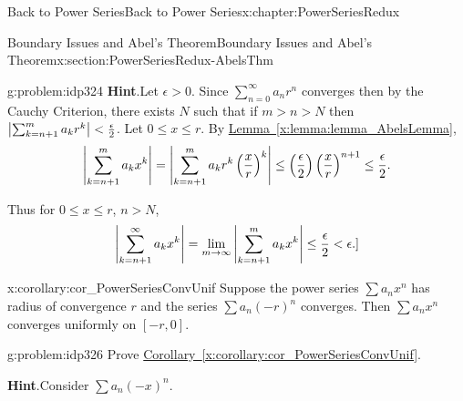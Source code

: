 \begin{chapterptx}{Back to Power Series}{}{Back to Power Series}{}{}{x:chapter:PowerSeriesRedux}
\begin{sectionptx}{Boundary Issues and Abel's Theorem}{}{Boundary Issues and Abel's Theorem}{}{}{x:section:PowerSeriesRedux-AbelsThm}
\begin{problem}{}{g:problem:idp324}
			\noindent\textbf{\blocktitlefont Hint}.\hypertarget{g:hint:idp325}{}\quad{}Let \(\epsilon>0\). Since \(\sum_{n=0}^\infty a_nr^n\) converges then by the Cauchy Criterion, there exists \(N\) such that if \(m>n>N\) then \(\left|\sum_{k=n+1}^ma_kr^k\right|< \frac{\epsilon}{2}\). Let \(0\leq x\leq r\). By \hyperref[x:lemma:lemma_AbelsLemma]{Lemma~{\xreffont\ref{x:lemma:lemma_AbelsLemma}}},%
			\begin{equation*}
				\left|\sum_{k=n+1}^ma_kx^k\right|=\left|\sum_{k=n+1}^ma_kr^k\left(\frac{x}{r}\right)^k\right|\leq \left(\frac{\epsilon}{2}\right)\left(\frac{x}{r}\right)^{n+1}\leq\frac{\epsilon}{2}\text{.}
			\end{equation*}
			\par
			Thus for \(0\leq x\leq r\), \(n>N\),%
			\begin{equation*}
				\left|\sum_{k=n+1}^\infty a_kx^k\right|=\lim_{m\rightarrow\infty}\left|\sum_{k=n+1}^ma_kx^k\right|\leq\frac{\epsilon}{2}< \epsilon.\rbrack{}
			\end{equation*}
		\end{problem}
		\begin{corollary}{}{}{x:corollary:cor_PowerSeriesConvUnif}%
			Suppose the power series \(\sum a_nx^n\) has radius of convergence \(r\) and the series \(\sum a_n\left(-r\right)^n\) converges. Then \(\sum a_nx^n\) converges uniformly on \([-r,0]\).%
		\end{corollary}
		\begin{problem}{}{g:problem:idp326}%
			Prove \hyperref[x:corollary:cor_PowerSeriesConvUnif]{Corollary~{\xreffont\ref{x:corollary:cor_PowerSeriesConvUnif}}}.%
			\par\smallskip%
			\noindent\textbf{\blocktitlefont Hint}.\hypertarget{g:hint:idp327}{}\quad{}Consider \(\sum a_n\left(-x\right)^n\).%
		\end{problem}
	\end{sectionptx}
\end{chapterptx}
%
%